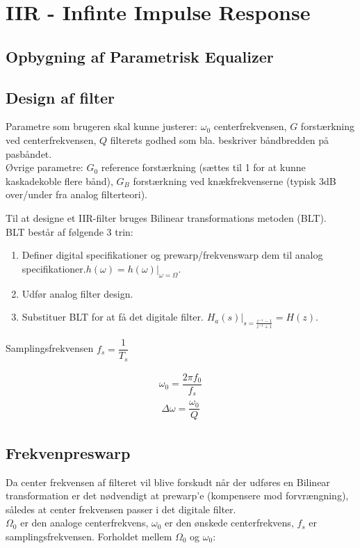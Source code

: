 \section{IIR - Infinte Impulse Response}\label{sec:iir} 

    \subsection{Opbygning af Parametrisk Equalizer}


 
    \subsection{Design af filter}
    Parametre som brugeren skal kunne justerer: $\omega_0$ centerfrekvensen, $G$ forstærkning ved centerfrekvensen, $Q$ filterets godhed som bla. beskriver
    båndbredden på pasbåndet.\\
    Øvrige parametre:
    $G_0$ reference forstærkning (sættes til 1 for at kunne kaskadekoble flere bånd), $G_B$ forstærkning ved knækfrekvenserne (typisk 3dB over/under fra analog filterteori).
    
    Til at designe et IIR-filter bruges Bilinear transformations metoden (BLT).\\
    BLT består af følgende 3 trin:
    \begin{enumerate}
        \item Definer digital specifikationer og prewarp/frekvenswarp dem til analog specifikationer.$h(\omega) = h(\omega)|_{\omega = \Omega}$.
        \item Udfør analog filter design.
        \item Substituer BLT for at få det digitale filter. $H_a(s)|_{s = \frac{z^{-1} - 1}{z^{-1} + 1}} = H(z) $.
    \end{enumerate}
    
    Samplingsfrekvensen $f_s = \dfrac{1}{T_s}$

    \begin{align*}
    \omega_0 = \dfrac{2 \pi f_0}{f_s}
    \end{align*}
        \begin{align}
        \Delta \omega = \dfrac{\omega_0}{Q}
        \end{align}

    \subsection{Frekvenpreswarp}
    Da center frekvensen af filteret vil blive forskudt når der udføres en Bilinear
    transformation er det nødvendigt at prewarp'e (kompensere mod forvrængning), således at center frekvensen passer i det digitale filter.\\
    $\Omega_0$ er den analoge centerfrekvens, $\omega_0$ er den ønskede centerfrekvens, $f_s$ er samplingsfrekvensen. 
    Forholdet mellem $\Omega_0$ og $\omega_0$:


